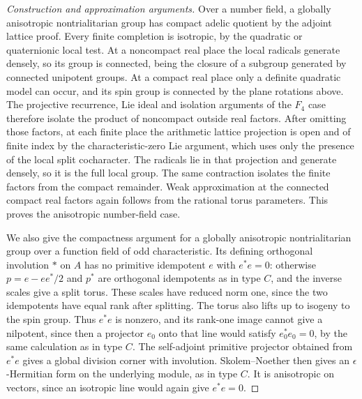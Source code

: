 \documentclass[11pt,a4paper,openany,oneside]{book}
\theoremstyle{resultstyle}
\theoremstyle{definition}
\numberwithin{equation}{chapter}
\begin{document}
\begin{proof}[Construction and approximation arguments]
Over a number field, a globally
anisotropic nontrialitarian group
has compact adelic quotient by
the adjoint lattice proof.
Every finite completion is
isotropic, by the quadratic or
quaternionic local test.
At a noncompact real place
the local radicals generate densely,
so its group is connected, being
the closure of a subgroup generated
by connected unipotent groups.
At a compact real place only a
definite quadratic model can occur,
and its spin group is connected
by the plane rotations above.
The projective recurrence,
Lie ideal and isolation arguments
of the \(F_4\) case therefore
isolate the product of noncompact
outside real factors.
After omitting those factors,
at each finite place the
arithmetic lattice projection is
open and of finite index by
the characteristic-zero Lie argument,
which uses only the presence of
the local split cocharacter.
The radicals lie in that
projection and generate densely,
so it is the full local
group. The same contraction
isolates the finite factors
from the compact remainder.
Weak approximation at the
connected compact real factors
again follows from the rational
torus parameters. This proves
the anisotropic number-field case.

We also give the compactness
argument for a globally anisotropic
nontrialitarian group over a
function field of odd characteristic.
Its defining orthogonal involution
\(\ast\) on \(A\) has no primitive
idempotent \(e\) with \(e^\ast e=0\):
otherwise \(p=e-ee^\ast/2\) and
\(p^\ast\) are orthogonal idempotents
as in type \(C\), and the inverse
scales give a split torus. These
scales have reduced norm one, since
the two idempotents have equal
rank after splitting. The torus
also lifts up to isogeny to the
spin group. Thus \(e^\ast e\) is
nonzero, and its rank-one image
cannot give a nilpotent,
since then a projector \(e_0\)
onto that line would satisfy
\(e_0^\ast e_0=0\), by the
same calculation as in type \(C\).
The self-adjoint primitive
projector obtained from \(e^\ast e\)
gives a global division corner
with involution. Skolem--Noether
then gives an \(\epsilon\)-Hermitian
form on the underlying module,
as in type \(C\). It is anisotropic
on vectors, since an isotropic
line would again give
\(e^\ast e=0\).


\end{proof}
\end{document}
